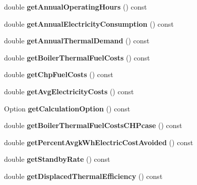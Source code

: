 \begin{DoxyCompactItemize}
\item 
\mbox{\label{class_c_h_p_aeeb03f1f40db034babf883a1e00ed2a3}} 
double {\bfseries get\+Annual\+Operating\+Hours} () const
\item 
\mbox{\label{class_c_h_p_a37d544d03c45668a9dc5d502cdcb6137}} 
double {\bfseries get\+Annual\+Electricity\+Consumption} () const
\item 
\mbox{\label{class_c_h_p_a849a576483b92b131ebfc0615e1e0bdb}} 
double {\bfseries get\+Annual\+Thermal\+Demand} () const
\item 
\mbox{\label{class_c_h_p_a9f6c6638b1be7c2df8ba4b406c3b2b94}} 
double {\bfseries get\+Boiler\+Thermal\+Fuel\+Costs} () const
\item 
\mbox{\label{class_c_h_p_a00929ba5d10367258dc1dc437eda88e3}} 
double {\bfseries get\+Chp\+Fuel\+Costs} () const
\item 
\mbox{\label{class_c_h_p_a2bc5ac0eb3d7ce42f77f26b3973f6c9f}} 
double {\bfseries get\+Avg\+Electricity\+Costs} () const
\item 
\mbox{\label{class_c_h_p_a858f0201818f637331e0d06d3171bee7}} 
Option {\bfseries get\+Calculation\+Option} () const
\item 
\mbox{\label{class_c_h_p_ace1d96aacf328bd62f01e0eceaae19f6}} 
double {\bfseries get\+Boiler\+Thermal\+Fuel\+Costs\+C\+H\+Pcase} () const
\item 
\mbox{\label{class_c_h_p_ad79607b304d1e50a9421de043b7a9e7b}} 
double {\bfseries get\+Percent\+Avgk\+Wh\+Electric\+Cost\+Avoided} () const
\item 
\mbox{\label{class_c_h_p_a195f0ffe163404077b56a5e5db8eb59c}} 
double {\bfseries get\+Standby\+Rate} () const
\item 
\mbox{\label{class_c_h_p_a66b1b0e6a0d7f3181b3c1dfb590ab523}} 
double {\bfseries get\+Displaced\+Thermal\+Efficiency} () const
\item 
\mbox{\label{class_c_h_p_a1d38e08a7815211361d334263832cad6}} 

\end{DoxyCompactItemize}
